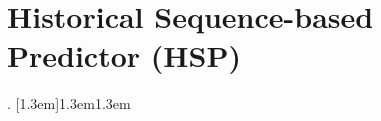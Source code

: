 \chapter[Published Paper: Historical Sequence-based Predictor (HSP)]{Historical Sequence-based Predictor (HSP)}







\newpage
.
\ifnotUCFormat
\else
{}[1.3em]{\vspace{0.5em}}{1.3em}{1.3em}
\fi

